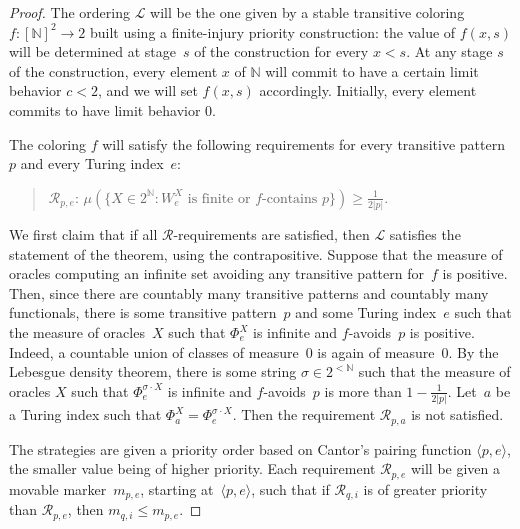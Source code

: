 \documentclass{article}
\numberwithin{theorem}{section}
\def\L{\mathcal{L}}
\newcommand{\R}{\mathcal{R}}
\newcommand{\cs}{2^{\NN}}
\newcommand{\bstr}{2^{<\NN}}
\newcommand{\NN}[0]{\mathbb{N}}
\begin{document}
\begin{proof}
The ordering $\L$ will be the one given by a stable transitive coloring $f : [\NN]^2 \to 2$ built using a finite-injury priority construction: the value of $f(x,s)$ will be determined at stage~$s$ of the construction for every $x < s$. At any stage $s$ of the construction, every element $x$ of $\NN$ will commit to have a certain limit behavior $c < 2$, and we will set $f(x,s)$ accordingly. Initially, every element commits to have limit behavior $0$.

The coloring $f$ will satisfy the following requirements for every transitive pattern~$p$ and every Turing index~$e$:
\begin{quote}
    $\R_{p,e}$: $\mu(\{ X \in \cs : W_e^X \mbox{ is finite or } f\mbox{-contains } p \}) \geq \frac{1}{2|p|}$.
\end{quote}
We first claim that if all $\R$-requirements are satisfied, then $\L$ satisfies the statement of the theorem, using the contrapositive.
Suppose that the measure of oracles computing an infinite set avoiding any transitive pattern for~$f$ is positive.
Then, since there are countably many transitive patterns and countably many functionals, there is some transitive pattern~$p$ and some Turing index~$e$ such that the measure of oracles~$X$ such that $\Phi_e^X$ is infinite and $f$-avoids~$p$ is positive. Indeed, a countable union of classes of measure~0 is again of measure~0. By the Lebesgue density theorem, there is some string $\sigma \in \bstr$ such that  the measure of oracles $X$ such that $\Phi_e^{\sigma \cdot X}$ is infinite and $f$-avoids~$p$ is more than $1-\frac{1}{2|p|}$.
Let~$a$ be a Turing index such that $\Phi_a^X = \Phi_e^{\sigma \cdot X}$. Then the requirement $\R_{p, a}$ is not satisfied. 

The strategies are given a priority order based on Cantor's pairing function $\langle p, e\rangle$, the smaller value being of higher priority. Each requirement $\R_{p, e}$ will be given a movable marker~$m_{p,e}$, starting at~$\langle p,e\rangle$, such that if $\R_{q, i}$ is of greater priority than $\R_{p, e}$, then $m_{q, i} \leq m_{p, e}$. %
\smallskip


\end{proof}
\end{document}
